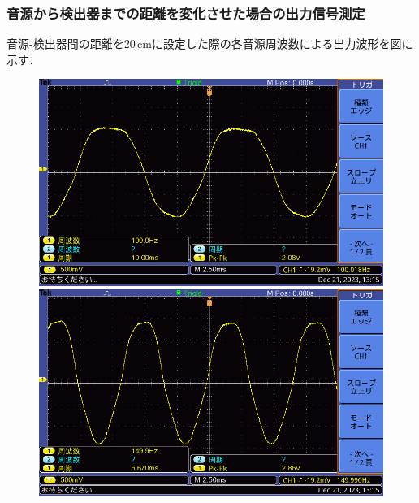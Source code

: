 \documentclass{ltjsarticle}
\begin{document}
		\subsubsection{音源から検出器までの距離を変化させた場合の出力信号測定}
			音源-検出器間の距離を20\,cmに設定した際の各音源周波数による出力波形を図に示す．
			\begin{figure}[H]
			\centering
			\begin{minipage}{0.4\columnwidth}
			\centering
			\includegraphics[width = \columnwidth]{figs/F0026TEK.PNG}
			\end{minipage}
			\hspace{0.04\columnwidth}
			\begin{minipage}{0.4\columnwidth}
			\centering
			\includegraphics[width = \columnwidth]{figs/F0027TEK.PNG}
			\end{minipage}
			\hspace{0.04\columnwidth}
			\begin{minipage}{0.4\columnwidth}

\end{minipage}
\end{figure}
\end{document}
